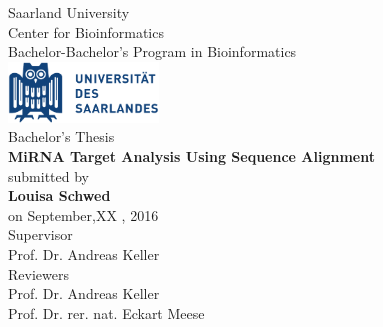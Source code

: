 \documentclass[11pt,  a4paper]{report}
\begin{document}
\def\supervisorIname{Advisor I}
\def\supervisorIIname{Second Reviewer}

	\def\university{Saarland Universitiy}
	\def\institute{Center for Bioinformatics}
	\def\chair{Bachelor's Program in Bioinformatics}
	\def\projectname{MiRNA Target Analysis Using Sequence Alignment}
	\vspace{.2em}  
	\def\author{Louisa Schwed}
	\def\date{September 2016}

\begin{titlepage}

  \begin{minipage}{\textwidth}
    \begin{center}
    { \large Saarland University \\ Center for Bioinformatics\\ Bachelor-Bachelor's Program in Bioinformatics \\}
	\vspace{0.5cm}
    \includegraphics[width=4cm]{Logo-Universitaet_des_Saarlandes.pdf}\\
    \vspace{1.5cm}
    { \large Bachelor's Thesis\\}
    \vspace{0.5cm}
    {\huge\textbf{\projectname}}\\
    \vspace{1.5cm}
    { \large submitted by}\\
	\vspace{0.5cm}
    {\large\textbf{\author}}\\
    \vspace{0.5cm}
    {\large on September,XX , 2016}\\
    \vspace{1.5cm}
    {\large Supervisor}\\
    \vspace{0.5cm}
    {\large Prof. Dr. Andreas Keller}\\
    \vspace{1.5cm}
    {\large Reviewers}\\
    \vspace{0.5cm}
    {\large Prof. Dr. Andreas Keller}\\
   	{\large Prof. Dr. rer. nat. Eckart Meese}\\
    \vspace{0.5cm}
    \end{center}
  \end{minipage}   
   

\end{titlepage}
\end{document}
